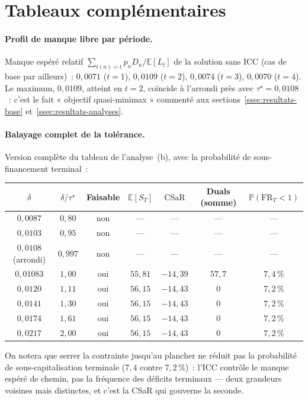 \documentclass[11pt,letterpaper]{article}
\newcommand{\E}{\mathbb{E}}
\newcommand{\prob}{\mathbb{P}}
\newcommand{\CSaR}{\mathrm{CSaR}}
\newcommand{\taustar}{\tau^{\star}}
\theoremstyle{definition}
\begin{document}
\section{Tableaux complémentaires}\label{app:tableaux}

\paragraph{Profil de manque libre par période.}
Manque espéré relatif $\sum_{t(n)=t} p_n D_n / \E[L_t]$ de la solution sans
ICC (cas de base par ailleurs)~: $0{,}0071$ ($t=1$), $0{,}0109$ ($t=2$),
$0{,}0074$ ($t=3$), $0{,}0070$ ($t=4$). Le maximum, $0{,}0109$, atteint en
$t=2$, coïncide à l'arrondi près avec $\taustar = 0{,}0108$~: c'est le fait
« objectif quasi-minimax » commenté aux
sections~\ref{ssec:resultats-base} et~\ref{ssec:resultats-analyses}.

\paragraph{Balayage complet de la tolérance.}
Version complète du tableau de l'analyse~(b), avec la probabilité de
sous-financement terminal~:

\begin{center}
\begin{tabular}{ccccccc}
\toprule
$\delta$ & $\delta/\taustar$ & Faisable & $\E[S_T]$ & $\CSaR$ &
Duals (somme) & $\prob(\mathrm{FR}_T<1)$ \\
\midrule
$0{,}0087$ & $0{,}80$ & non & --- & --- & --- & --- \\
$0{,}0103$ & $0{,}95$ & non & --- & --- & --- & --- \\
$0{,}0108$ (arrondi) & $0{,}997$ & non & --- & --- & --- & --- \\
$0{,}01083$ & $1{,}00$ & oui & $55{,}81$ & $-14{,}39$ & $57{,}7$ & $7{,}4\,\%$ \\
$0{,}0120$ & $1{,}11$ & oui & $56{,}15$ & $-14{,}43$ & $0$ & $7{,}2\,\%$ \\
$0{,}0141$ & $1{,}30$ & oui & $56{,}15$ & $-14{,}43$ & $0$ & $7{,}2\,\%$ \\
$0{,}0174$ & $1{,}61$ & oui & $56{,}15$ & $-14{,}43$ & $0$ & $7{,}2\,\%$ \\
$0{,}0217$ & $2{,}00$ & oui & $56{,}15$ & $-14{,}43$ & $0$ & $7{,}2\,\%$ \\
\bottomrule
\end{tabular}
\end{center}

On notera que serrer la contrainte jusqu'au plancher ne réduit pas la
probabilité de sous-capitalisation terminale ($7{,}4$ contre $7{,}2\,\%$)~: l'ICC
contrôle le manque espéré de chemin, pas la fréquence des déficits terminaux
--- deux grandeurs voisines mais distinctes, et c'est la CSaR qui gouverne la
seconde.
\end{document}
